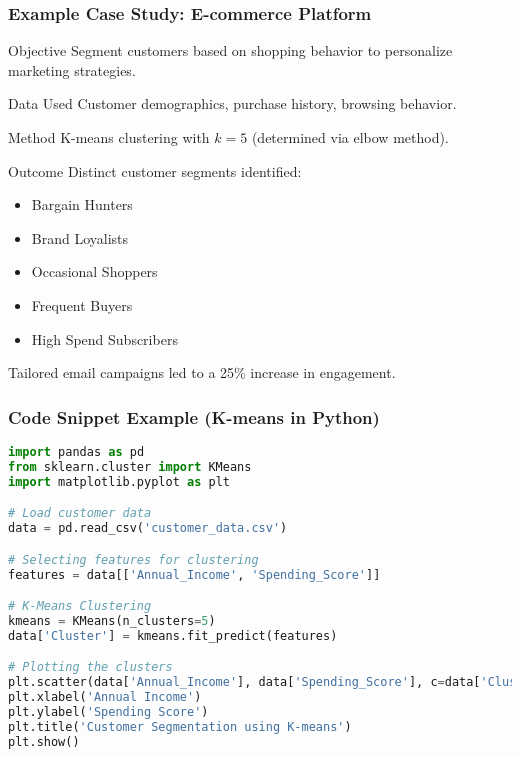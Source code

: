 \documentclass[aspectratio=169]{beamer}
\begin{document}
\begin{frame}[fragile]
    \frametitle{Example Case Study: E-commerce Platform}
    \begin{block}{Objective}
        Segment customers based on shopping behavior to personalize marketing strategies.
    \end{block}
    
    \begin{block}{Data Used}
        Customer demographics, purchase history, browsing behavior.
    \end{block}

    \begin{block}{Method}
        K-means clustering with $k = 5$ (determined via elbow method).
    \end{block}

    \begin{block}{Outcome}
        Distinct customer segments identified:
        \begin{itemize}
            \item Bargain Hunters
            \item Brand Loyalists
            \item Occasional Shoppers
            \item Frequent Buyers
            \item High Spend Subscribers
        \end{itemize}
        Tailored email campaigns led to a 25\% increase in engagement.
    \end{block}
\end{frame}

\begin{frame}[fragile]
    \frametitle{Code Snippet Example (K-means in Python)}
    \begin{lstlisting}[language=Python]
import pandas as pd
from sklearn.cluster import KMeans
import matplotlib.pyplot as plt

# Load customer data
data = pd.read_csv('customer_data.csv')

# Selecting features for clustering
features = data[['Annual_Income', 'Spending_Score']]

# K-Means Clustering
kmeans = KMeans(n_clusters=5)
data['Cluster'] = kmeans.fit_predict(features)

# Plotting the clusters
plt.scatter(data['Annual_Income'], data['Spending_Score'], c=data['Cluster'])
plt.xlabel('Annual Income')
plt.ylabel('Spending Score')
plt.title('Customer Segmentation using K-means')
plt.show()
    \end{lstlisting}
\end{frame}
\end{document}
